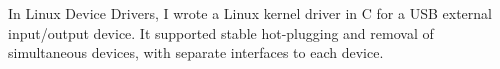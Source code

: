 {
  In Linux Device Drivers, I wrote a Linux kernel driver in C for a USB external input/output device. It supported stable hot-plugging and removal of simultaneous devices, with separate interfaces to each device.
}

